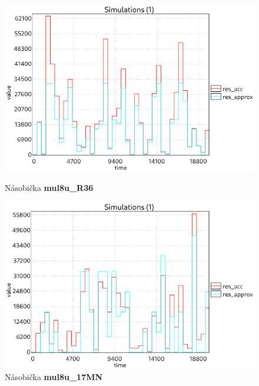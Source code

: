 \begin{figure}[H]
\centering
\begin{minipage}{.5\textwidth}
  \centering
  \includegraphics[width=0.95\linewidth]{obrazky-figures/results_R36.png}
  \caption{Násobička \textbf{mul8u\_R36}}
  \label{fig:results_R36}
\end{minipage}%
\begin{minipage}{.5\textwidth}
  \centering
  \includegraphics[width=0.95\linewidth]{obrazky-figures/results_17MN.png}
  \caption{Násobička \textbf{mul8u\_17MN}}
  \label{fig:results_17MN}
\end{minipage}
\end{figure}

